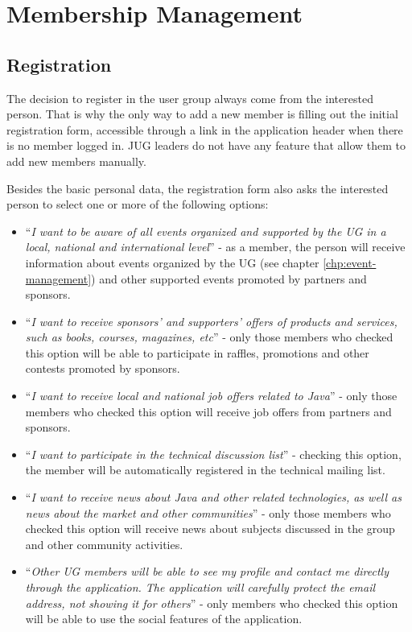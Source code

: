 \documentclass[10pt,a4paper]{report}
\begin{document}
\chapter{Membership Management}

\section{Registration}

The decision to register in the user group always come from the interested person. That is why the only way to add a new member is filling out the initial registration form, accessible through a link in the application header when there is no member logged in. JUG leaders do not have any feature that allow them to add new members manually.

Besides the basic personal data, the registration form also asks the interested person to select one or more of the following options:
\begin{itemize}
\item ``\textit{I want to be aware of all events organized and supported by the UG in a local, national and international level}'' - as a member, the person will receive information about events organized by the UG (see chapter \ref{chp:event-management}) and other supported events promoted by partners and sponsors.
\item ``\textit{I want to receive sponsors' and supporters' offers of products and services, such as books, courses, magazines, etc}'' - only those members who checked this option will be able to participate in raffles, promotions and other contests promoted by sponsors.
\item ``\textit{I want to receive local and national job offers related to Java}'' - only those members who checked this option will receive job offers from partners and sponsors.
\item ``\textit{I want to participate in the technical discussion list}'' - checking this option, the member will be automatically registered in the technical mailing list.
\item ``\textit{I want to receive news about Java and other related technologies, as well as news about the market and other communities}'' - only those members who checked this option will receive news about subjects discussed in the group and other community activities.
\item ``\textit{Other UG members will be able to see my profile and contact me directly through the application. The application will carefully protect the email address, not showing it for others}'' - only members who checked this option will be able to use the social features of the application.
\end{itemize}
\end{document}
